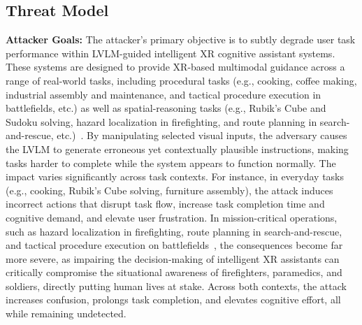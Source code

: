 \documentclass[sigconf,review,anonymous]{acmart}
\begin{document}
 

\subsection{Threat Model}
\label{sec:threatnodel}
\textbf{Attacker Goals:}
The attacker's primary objective is to subtly degrade user task performance within LVLM-guided intelligent XR cognitive assistant systems. These systems are designed to provide XR-based multimodal guidance across a range of real-world tasks, including procedural tasks (e.g., cooking, coffee making, industrial assembly and maintenance, and tactical procedure execution in battlefields, etc.) as well as spatial-reasoning tasks (e.g., Rubik’s Cube and Sudoku solving, hazard localization in firefighting, and route planning in search-and-rescue, etc.)~\cite{ren2025rubikon, shi2021spatial, srinidhi2024xair, ghasemi2023embedding, zhao2025guided, dugar2024augmented, vir2024archef, lau2025adaptive, qu2024looking}. By manipulating selected visual inputs, the adversary causes the LVLM to generate erroneous yet contextually plausible instructions, making tasks harder to complete while the system appears to function normally. The impact varies significantly across task contexts. For instance, in everyday tasks (e.g., cooking, Rubik's Cube solving, furniture assembly), the attack induces incorrect actions that disrupt task flow, increase task completion time and cognitive demand, and elevate user frustration. In mission-critical operations, such as hazard localization in firefighting, route planning in search-and-rescue, and tactical procedure execution on battlefields~\cite{shi2021spatial}, the consequences become far more severe, as impairing the decision-making of intelligent XR assistants can critically compromise the situational awareness of firefighters, paramedics, and soldiers, directly putting human lives at stake. Across both contexts, the attack increases confusion, prolongs task completion, and elevates cognitive effort, all while remaining undetected.
\end{document}
